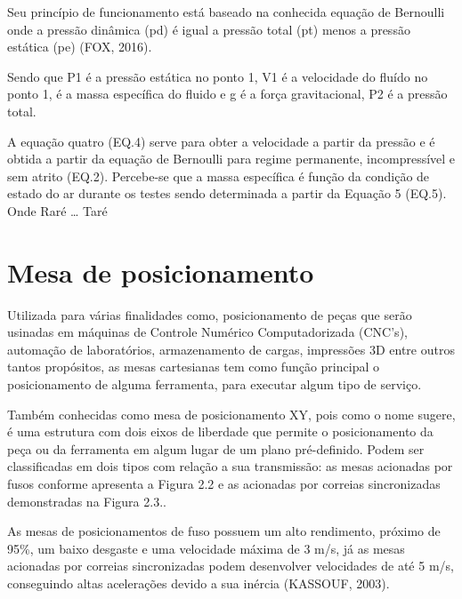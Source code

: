 Seu princípio de funcionamento está baseado na conhecida equação de Bernoulli onde  a pressão dinâmica (pd) 
é igual a pressão total (pt) menos a pressão estática (pe) (FOX, 2016).

Sendo que P1  é a pressão estática no ponto 1, V1 é a velocidade do fluído no ponto 1, é a massa  específica do fluido 
e g é a força gravitacional, P2 é a pressão total.

A equação quatro (EQ.4) serve para obter a velocidade a partir da pressão e é obtida a partir da equação de 
Bernoulli para regime permanente, incompressível e sem atrito (EQ.2). Percebe-se que a massa específica é 
função da condição de estado do ar durante os testes sendo determinada a partir da Equação 5 (EQ.5). 
Onde Raré  … Taré

\section{Mesa de posicionamento }

Utilizada para várias finalidades como, posicionamento de peças que serão usinadas em máquinas de Controle 
Numérico Computadorizada (CNC’s), automação de laboratórios, armazenamento de cargas, impressões 3D entre 
outros tantos propósitos, as mesas cartesianas tem como função principal o posicionamento de alguma 
ferramenta, para executar algum tipo de serviço.

Também conhecidas como mesa de posicionamento XY, pois como o nome sugere, é uma estrutura com dois eixos 
de liberdade que permite o posicionamento da peça ou da ferramenta em algum lugar de um plano pré-definido. 
Podem ser classificadas em dois tipos com relação a sua transmissão:  as mesas acionadas por fusos conforme 
apresenta a Figura 2.2 e as acionadas por correias sincronizadas demonstradas na Figura 2.3..

As mesas de posicionamentos de fuso possuem um alto rendimento, próximo de 95\%, um baixo desgaste e uma 
velocidade máxima de 3 m/s, já as mesas acionadas por correias sincronizadas podem desenvolver velocidades 
de até 5 m/s, conseguindo altas acelerações  devido a sua inércia (KASSOUF, 2003).

